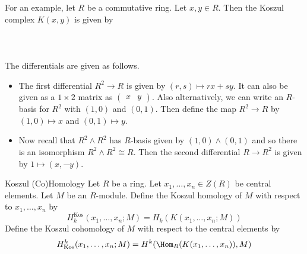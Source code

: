 \documentclass[a4paper]{article}
\begin{document}
For an example, let $R$ be a commutative ring. Let $x,y\in R$. Then the Koszul complex $K(x,y)$ is given by \\~\\
\\~\\
The differentials are given as follows. 
\begin{itemize}
\item The first differential $R^2\to R$ is given by $(r,s)\mapsto rx+sy$. It can also be given as a $1\times 2$ matrix as $\begin{pmatrix}x & y\end{pmatrix}$. Also alternatively, we can write an $R$-basis for $R^2$ with $(1,0)$ and $(0,1)$. Then define the map $R^2\to R$ by $(1,0)\mapsto x$ and $(0,1)\mapsto y$. 
\item Now recall that $R^2\wedge R^2$ has $R$-basis given by $(1,0)\wedge(0,1)$ and so there is an isomorphism $R^2\wedge R^2\cong R$. Then the second differential $R\to R^2$ is given by $1\mapsto(x,-y)$. 
\end{itemize}

\begin{defn}{Koszul (Co)Homology}{} Let $R$ be a ring. Let $x_1,\dots,x_n\in Z(R)$ be central elements. Let $M$ be an $R$-module. Define the Koszul homology of $M$ with respect to $x_1,\dots,x_n$ by $$H_k^\text{Kos}(x_1,\dots,x_n;M)=H_k(K(x_1,\dots,x_n;M))$$ Define the Koszul cohomology of $M$ with respect to the central elements by $$H_\text{Kos}^k(x_1,\dots,x_n;M)=H^k(\Hom_R(K(x_1,\dots,x_n)),M)$$
\end{defn}
\end{document}
